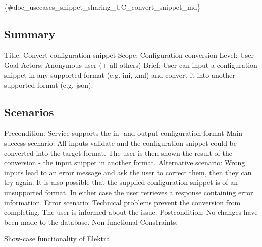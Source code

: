 \{\#doc\+\_\+usecases\+\_\+snippet\+\_\+sharing\+\_\+\+U\+C\+\_\+convert\+\_\+snippet\+\_\+md\}

\subsection*{Summary}

Title\+: Convert configuration snippet Scope\+: Configuration conversion Level\+: User Goal Actors\+: Anonymous user (+ all others) Brief\+: User can input a configuration snippet in any supported format (e.\+g. ini, xml) and convert it into another supported format (e.\+g. json).

\subsection*{Scenarios}

Precondition\+: Service supports the in-\/ and output configuration format Main success scenario\+: All inputs validate and the configuration snippet could be converted into the target format. The user is then shown the result of the conversion -\/ the input snippet in another format. Alternative scenario\+: Wrong inputs lead to an error message and ask the user to correct them, then they can try again. It is also possible that the supplied configuration snippet is of an unsupported format. In either case the user retrieves a response containing error information. Error scenario\+: Technical problems prevent the conversion from completing. The user is informed about the issue. Postcondition\+: No changes have been made to the database. Non-\/functional Constraints\+:
\begin{DoxyItemize}
\item Show-\/case functionality of Elektra 
\end{DoxyItemize}